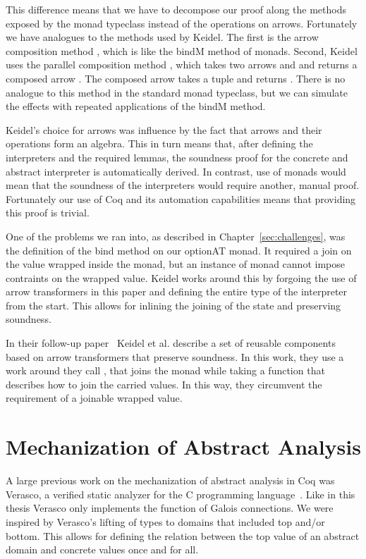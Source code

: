 This difference means that we have to decompose our proof along the methods
exposed by the monad typeclass instead of the operations on arrows. Fortunately
we have analogues to the methods used by Keidel. The first is the arrow
composition method \coq{>>> }, which is like the bindM method of monads.  Second,
Keidel uses the parallel composition method \coq{*** }, which takes two arrows 
 and  and
returns a composed arrow . The composed arrow takes a tuple 
and returns . There is no analogue to this method in the standard
monad typeclass, but we can simulate the effects with repeated applications of
the bindM method.

Keidel's choice for arrows was influence by the fact that arrows and their
operations form an algebra. This in turn means that, after defining the
interpreters and the required lemmas, the soundness proof for the concrete and
abstract interpreter is automatically derived. In contrast, use of monads would
mean that the soundness of the interpreters would require another, manual
proof. Fortunately our use of Coq and its automation capabilities means that
providing this proof is trivial. 

One of the problems we ran into, as described in Chapter~\ref{sec:challenges},
was the definition of the bind method on our optionAT monad. It required a join
on the value wrapped inside the monad, but an instance of monad cannot impose
contraints on the wrapped value. Keidel works around this by forgoing the use
of arrow transformers in this paper and defining the entire type of the
interpreter from the start. This allows for inlining the joining of the state
and preserving soundness.

In their follow-up paper~\cite{keidel2019sound} Keidel et al. describe a set of
reusable components based on arrow transformers that preserve soundness. In
this work, they use a work around they call , that joins the monad while taking a function that
describes how to join the carried values. In this way, they circumvent the
requirement of a joinable wrapped value.

\section{Mechanization of Abstract Analysis}
A large previous work on the mechanization of abstract analysis in Coq was
Verasco, a verified static analyzer for the C programming
language~\cite{jourdan2016verasco}. Like in
this thesis Verasco only implements the  function of Galois
connections. We were inspired by Verasco's lifting of types to domains that
included top and/or bottom. This allows for defining the relation between the
top value of an abstract domain and concrete values once and for all. 

